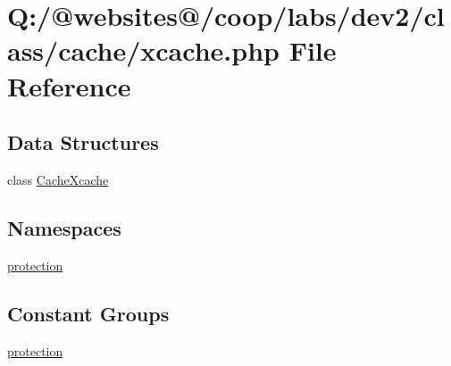 \hypertarget{xcache_8php}{\section{Q\-:/@websites@/coop/labs/dev2/class/cache/xcache.php File Reference}
\label{xcache_8php}
}
\subsection*{Data Structures}
\begin{DoxyCompactItemize}
\item 
class \hyperlink{class_cache_xcache}{Cache\-Xcache}
\end{DoxyCompactItemize}
\subsection*{Namespaces}
\begin{DoxyCompactItemize}
\item 
\hyperlink{namespaceprotection}{protection}
\end{DoxyCompactItemize}
\subsection*{Constant Groups}
\begin{DoxyCompactItemize}
\item 
\hyperlink{namespaceprotection}{protection}
\end{DoxyCompactItemize}
